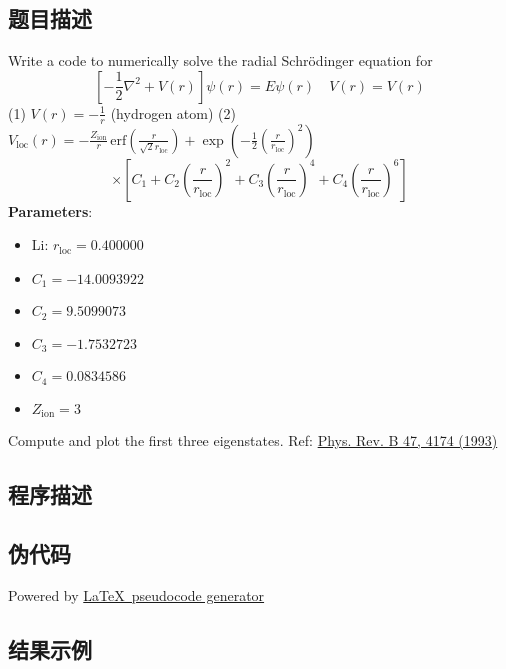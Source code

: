 \subsection{题目描述}
\noindent Write a code to numerically solve the radial Schrödinger equation for
\[
\left[-\frac{1}{2}\nabla^2 + V(r)\right] \psi(r) = E\psi(r) \quad V(r) = V(r)
\]
(1) \( V(r) = -\frac{1}{r} \) (hydrogen atom)
(2) \( V_{\text{loc}}(r) = -\frac{Z_{\text{ion}}}{r} \, \text{erf}\left(\frac{r}{\sqrt{2} r_{\text{loc}}}\right) + \exp\left(-\frac{1}{2} \left(\frac{r}{r_{\text{loc}}}\right)^2\right) \)
\[
\times \left[C_1 + C_2 \left(\frac{r}{r_{\text{loc}}}\right)^2 + C_3 \left(\frac{r}{r_{\text{loc}}}\right)^4 + C_4 \left(\frac{r}{r_{\text{loc}}}\right)^6\right]
\]
\textbf{Parameters}:
\begin{itemize}
    \item Li: \( r_{\text{loc}} = 0.400000 \)
    \item \( C_1 = -14.0093922 \)
    \item \( C_2 = 9.5099073 \)
    \item \( C_3 = -1.7532723 \)
    \item \( C_4 = 0.0834586 \)
    \item \( Z_{\text{ion}} = 3 \)
\end{itemize}
Compute and plot the first three eigenstates.
Ref: \href{https://journals.aps.org/prb/abstract/10.1103/PhysRevB.47.4174}{Phys. Rev. B 47, 4174 (1993)}

\subsection{程序描述}

\subsection{伪代码}
Powered by \href{https://chatgpt.com/g/g-xJJAA2awf-latex-pseudocode-generator}{\LaTeX \ pseudocode generator}

\subsection{结果示例}

